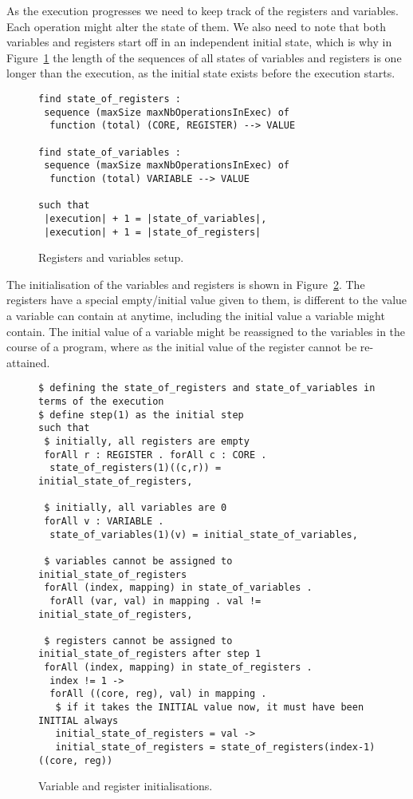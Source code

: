 \documentclass[runningheads]{llncs}
\begin{document}
As the execution progresses we need to keep track of the registers and variables.
Each operation might alter the state of them.
We also need to note that both variables and registers start off in an independent initial state, which is why in Figure~\ref{fig:essence4} the length of the sequences of all states of variables and registers is one longer than the execution, as the initial state exists before the execution starts.

\begin{figure}
\begin{lstlisting}
find state_of_registers :
 sequence (maxSize maxNbOperationsInExec) of
  function (total) (CORE, REGISTER) --> VALUE

find state_of_variables :
 sequence (maxSize maxNbOperationsInExec) of
  function (total) VARIABLE --> VALUE

such that
 |execution| + 1 = |state_of_variables|,
 |execution| + 1 = |state_of_registers|
\end{lstlisting}
\caption{Registers and variables setup. \label{fig:essence4}}
\end{figure}


The initialisation of the variables and registers is shown in Figure~\ref{fig:essence-step1}.
The registers have a special empty/initial value given to them, is different to the value a variable can contain at anytime, including the initial value a variable might contain.
The initial value of a variable might be reassigned to the variables in the course of a program, where as the initial value of the register cannot be re-attained.

\begin{figure}
\begin{lstlisting}
$ defining the state_of_registers and state_of_variables in terms of the execution
$ define step(1) as the initial step
such that
 $ initially, all registers are empty
 forAll r : REGISTER . forAll c : CORE .
  state_of_registers(1)((c,r)) = initial_state_of_registers,

 $ initially, all variables are 0
 forAll v : VARIABLE .
  state_of_variables(1)(v) = initial_state_of_variables,

 $ variables cannot be assigned to initial_state_of_registers
 forAll (index, mapping) in state_of_variables .
  forAll (var, val) in mapping . val != initial_state_of_registers,

 $ registers cannot be assigned to initial_state_of_registers after step 1
 forAll (index, mapping) in state_of_registers .
  index != 1 ->
  forAll ((core, reg), val) in mapping .
   $ if it takes the INITIAL value now, it must have been INITIAL always
   initial_state_of_registers = val ->
   initial_state_of_registers = state_of_registers(index-1)((core, reg))
\end{lstlisting}
\caption{Variable and register initialisations.\label{fig:essence-step1}}
\end{figure}
\end{document}
